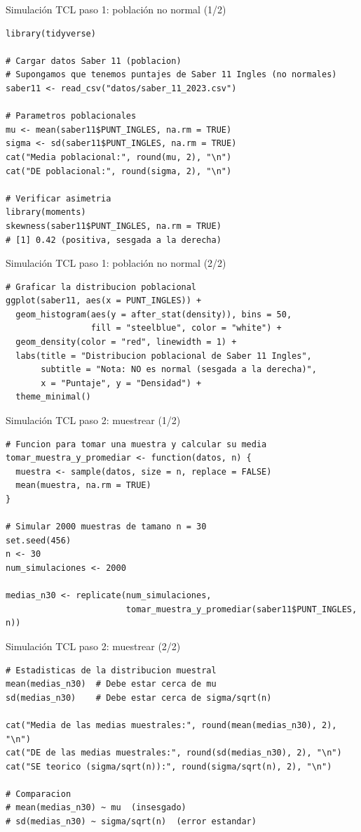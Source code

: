 \documentclass[aspectratio=169, 11pt]{beamer}
\begin{document}
\begin{frame}[fragile]{Simulación TCL paso 1: población no normal (1/2)}
\begin{lstlisting}
library(tidyverse)

# Cargar datos Saber 11 (poblacion)
# Supongamos que tenemos puntajes de Saber 11 Ingles (no normales)
saber11 <- read_csv("datos/saber_11_2023.csv")

# Parametros poblacionales
mu <- mean(saber11$PUNT_INGLES, na.rm = TRUE)
sigma <- sd(saber11$PUNT_INGLES, na.rm = TRUE)
cat("Media poblacional:", round(mu, 2), "\n")
cat("DE poblacional:", round(sigma, 2), "\n")

# Verificar asimetria
library(moments)
skewness(saber11$PUNT_INGLES, na.rm = TRUE)
# [1] 0.42 (positiva, sesgada a la derecha)
\end{lstlisting}
\end{frame}

\begin{frame}[fragile]{Simulación TCL paso 1: población no normal (2/2)}
\begin{lstlisting}
# Graficar la distribucion poblacional
ggplot(saber11, aes(x = PUNT_INGLES)) +
  geom_histogram(aes(y = after_stat(density)), bins = 50,
                 fill = "steelblue", color = "white") +
  geom_density(color = "red", linewidth = 1) +
  labs(title = "Distribucion poblacional de Saber 11 Ingles",
       subtitle = "Nota: NO es normal (sesgada a la derecha)",
       x = "Puntaje", y = "Densidad") +
  theme_minimal()
\end{lstlisting}
\end{frame}

\begin{frame}[fragile]{Simulación TCL paso 2: muestrear (1/2)}
\begin{lstlisting}
# Funcion para tomar una muestra y calcular su media
tomar_muestra_y_promediar <- function(datos, n) {
  muestra <- sample(datos, size = n, replace = FALSE)
  mean(muestra, na.rm = TRUE)
}

# Simular 2000 muestras de tamano n = 30
set.seed(456)
n <- 30
num_simulaciones <- 2000

medias_n30 <- replicate(num_simulaciones,
                        tomar_muestra_y_promediar(saber11$PUNT_INGLES, n))
\end{lstlisting}
\end{frame}

\begin{frame}[fragile]{Simulación TCL paso 2: muestrear (2/2)}
\begin{lstlisting}
# Estadisticas de la distribucion muestral
mean(medias_n30)  # Debe estar cerca de mu
sd(medias_n30)    # Debe estar cerca de sigma/sqrt(n)

cat("Media de las medias muestrales:", round(mean(medias_n30), 2), "\n")
cat("DE de las medias muestrales:", round(sd(medias_n30), 2), "\n")
cat("SE teorico (sigma/sqrt(n)):", round(sigma/sqrt(n), 2), "\n")

# Comparacion
# mean(medias_n30) ~ mu  (insesgado)
# sd(medias_n30) ~ sigma/sqrt(n)  (error estandar)
\end{lstlisting}
\end{frame}
\end{document}
